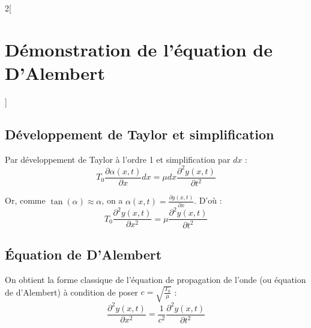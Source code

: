 \documentclass[a4paper,12pt]{article}
\begin{document}
\begin{multicols}{2}[
    \section*{Démonstration de l'équation de D'Alembert}
    ]
        \subsection*{Développement de Taylor et simplification}

            Par développement de Taylor à l'ordre 1 et simplification par $dx$ :
            $$ T_0 \frac{\partial \alpha(x,t)}{\partial x} dx = \mu dx \frac{\partial^2 y(x,t)}{\partial t^2} $$

            Or, comme $\tan(\alpha) \approx \alpha$, on a $\alpha(x,t) = \frac{\partial y(x,t)}{\partial x}$. D'où :
            $$ T_0 \frac{\partial^2 y(x,t)}{\partial x^2} = \mu \frac{\partial^2 y(x,t)}{\partial t^2} $$

        \subsection*{Équation de D'Alembert}

            On obtient la forme classique de l'équation de propagation de l'onde (ou équation de d'Alembert) à condition de poser $c = \sqrt{\frac{T_0}{\mu}}$ :
            $$
            \boxed{
            \frac{\partial^2 y(x,t)}{\partial x^2} = \frac{1}{c^2} \frac{\partial^2 y(x,t)}{\partial t^2}
            }
            $$
    \end{multicols}
\end{document}
